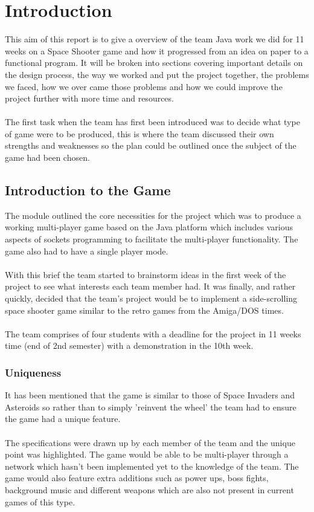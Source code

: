 
\chapter{Introduction}
\label{cha:introduction}

This aim of this report is to give a overview of the team Java work we did for 11 weeks on a Space Shooter game and how it progressed from an idea on paper to a functional program.
It will be broken into sections covering important details on the design process, the way we worked and put the project together, the problems we faced, how we over came those problems and how we could improve the project further with more time and resources.\\\\
The first task when the team has first been introduced was to decide what type of game were to be produced, this is where the team discussed their own strengths and weaknesses so the plan could be outlined once the subject of the game had been chosen.

\section{Introduction to the Game}
\label{sec: intro_to_game}
The module outlined the core necessities for the project which was to produce a working multi-player game based on the Java platform which includes various aspects of sockets programming to facilitate the multi-player functionality. The game also had to have a single player mode.\\\\
With this brief the team started to brainstorm ideas in the first week of the project to see what interests each team member had. It was finally, and rather quickly, decided that the team's project would be to implement a side-scrolling space shooter game similar to the retro games from the Amiga/DOS times.\\\\
The team comprises of four students with a deadline for the project in 11 weeks time (end of 2nd semester) with a demonstration in the 10th week.
\subsection{Uniqueness}It has been mentioned that the game is similar to those of Space Invaders and Asteroids so rather than to simply 'reinvent the wheel' the team had to ensure the game had a unique feature.\\\\
The specifications were drawn up by each member of the team and the unique point was highlighted. The game would be able to be multi-player through a network which hasn't been implemented yet to the knowledge of the team. The game would also feature extra additions such as power ups, boss fights, background music and different weapons which are also not present in current games of this type.
